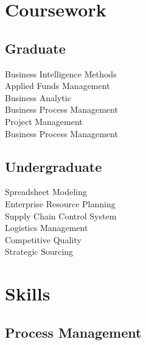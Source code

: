 \documentclass[letterpaper]{deedy-resume} %
\begin{document}
\begin{minipage}[t]{0.33\textwidth}
\sectionspace %



\section{Coursework}

\subsection{Graduate}

Business Intelligence Methods \\
Applied Funds Management \\
Business Analytic \\
Business Process Management \\
Project Management \\
Business Process Management\\

\sectionspace %


\subsection{Undergraduate}

Spreadsheet Modeling\\
Enterprise Resource Planning \\
Supply Chain Control System \\
Logistics Management \\
Competitive Quality \\
Strategic Sourcing\\


\sectionspace %



\section{Skills}

\subsection{Process Management}


\end{minipage}
\end{document}
